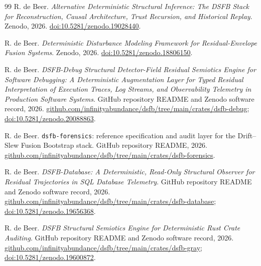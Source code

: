 \documentclass[11pt,a4paper]{article}
\begin{document}
\begin{thebibliography}{99}
R. de Beer.
\newblock \emph{Alternative Deterministic Structural Inference: The DSFB Stack for Reconstruction, Causal Architecture, Trust Recursion, and Historical Replay}.
\newblock Zenodo, 2026.
\newblock \href{https://doi.org/10.5281/zenodo.19028440}{doi:10.5281/zenodo.19028440}.

R. de Beer.
\newblock \emph{Deterministic Disturbance Modeling Framework for Residual-Envelope Fusion Systems}.
\newblock Zenodo, 2026.
\newblock \href{https://doi.org/10.5281/zenodo.18806150}{doi:10.5281/zenodo.18806150}.

R. de Beer.
\newblock \emph{DSFB-Debug Structural Detector-Field Residual Semiotics Engine for Software Debugging: A Deterministic Augmentation Layer for Typed Residual Interpretation of Execution Traces, Log Streams, and Observability Telemetry in Production Software Systems}.
\newblock GitHub repository README and Zenodo software record, 2026.
\newblock \href{https://github.com/infinityabundance/dsfb/tree/main/crates/dsfb-debug}{github.com/infinityabundance/dsfb/tree/main/crates/dsfb-debug};
\href{https://doi.org/10.5281/zenodo.20088863}{doi:10.5281/zenodo.20088863}.

R. de Beer.
\newblock \texttt{dsfb-forensics}: reference specification and audit layer for the Drift--Slew Fusion Bootstrap stack.
\newblock GitHub repository README, 2026.
\newblock \href{https://github.com/infinityabundance/dsfb/tree/main/crates/dsfb-forensics}{github.com/infinityabundance/dsfb/tree/main/crates/dsfb-forensics}.

R. de Beer.
\newblock \emph{DSFB-Database: A Deterministic, Read-Only Structural Observer for Residual Trajectories in SQL Database Telemetry}.
\newblock GitHub repository README and Zenodo software record, 2026.
\newblock \href{https://github.com/infinityabundance/dsfb/tree/main/crates/dsfb-database}{github.com/infinityabundance/dsfb/tree/main/crates/dsfb-database};
\href{https://doi.org/10.5281/zenodo.19656368}{doi:10.5281/zenodo.19656368}.

R. de Beer.
\newblock \emph{DSFB Structural Semiotics Engine for Deterministic Rust Crate Auditing}.
\newblock GitHub repository README and Zenodo software record, 2026.
\newblock \href{https://github.com/infinityabundance/dsfb/tree/main/crates/dsfb-gray}{github.com/infinityabundance/dsfb/tree/main/crates/dsfb-gray};
\href{https://doi.org/10.5281/zenodo.19600872}{doi:10.5281/zenodo.19600872}.


\end{thebibliography}
\end{document}
